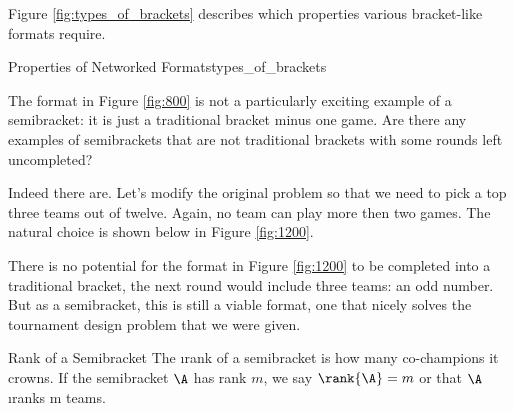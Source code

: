 {    Figure \ref{fig:types_of_brackets} describes which properties various bracket-like formats require.

    \begin{figg}{Properties of Networked Formats}{types_of_brackets}
        \begin{center}
        \end{center}
    \end{figg} 

    The format in Figure \ref{fig:800} is not a particularly exciting example of a semibracket: it is just a traditional bracket minus one game. Are there any examples of semibrackets that are not traditional brackets with some rounds left uncompleted?

    Indeed there are. Let's modify the original problem so that we need to pick a top three teams out of twelve. Again, no team can play more then two games. The natural choice is shown below in Figure \ref{fig:1200}.
    

    There is no potential for the format in Figure \ref{fig:1200} to be completed into a traditional bracket, the next round would include three teams: an odd number. But as a semibracket, this is still a viable format, one that nicely solves the tournament design problem that we were given.
    
    \begin{definition}{Rank of a Semibracket}{}
        The \i{rank} of a semibracket is how many co-champions it crowns. If the semibracket $\A$ has rank $m$, we say $\rank{\A} = m$ or that $\A$ \i{ranks m teams}.
    \end{definition}

}
